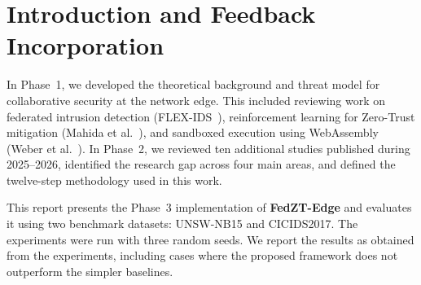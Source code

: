 \documentclass[11pt,a4paper]{article}
\newcommand{\bigsection}[1]{\FloatBarrier\Needspace*{0.22\textheight}\section{#1}}
\begin{document}
\tableofcontents
\newpage

\bigsection{Introduction and Feedback Incorporation}\label{sec:intro}

In Phase~1, we developed the theoretical background and threat model for collaborative security at the network edge. This included reviewing work on federated intrusion detection (FLEX-IDS~\cite{flexids}), reinforcement learning for Zero-Trust mitigation (Mahida et al.~\cite{mahida2026}), and sandboxed execution using WebAssembly (Weber et al.~\cite{weber2026}). In Phase~2, we reviewed ten additional studies published during 2025--2026, identified the research gap across four main areas, and defined the twelve-step methodology used in this work.

This report presents the Phase~3 implementation of \textbf{FedZT-Edge} and evaluates it using two benchmark datasets: UNSW-NB15 and CICIDS2017. The experiments were run with three random seeds. We report the results as obtained from the experiments, including cases where the proposed framework does not outperform the simpler baselines.
\end{document}
